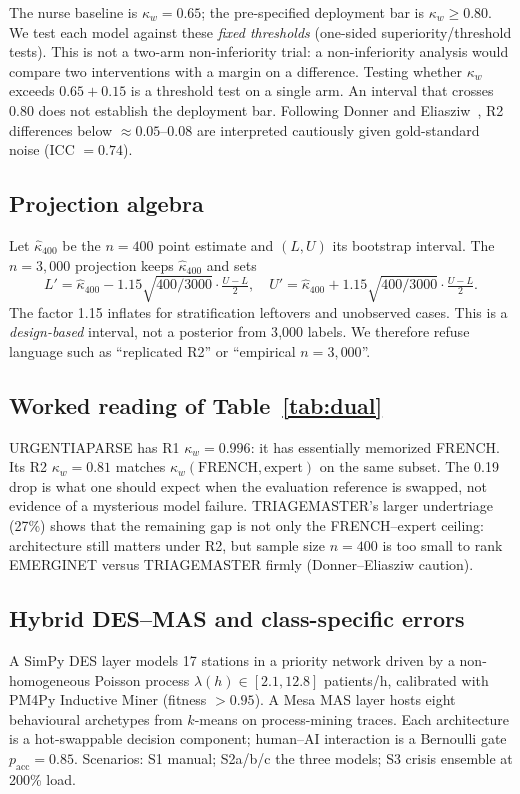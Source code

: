\documentclass[conference]{IEEEtran}
\begin{document}
The nurse baseline is $\kappa_w=0.65$; the pre-specified deployment bar is $\kappa_w\geq0.80$. We test each model against these \emph{fixed thresholds} (one-sided superiority/threshold tests). This is not a two-arm non-inferiority trial: a non-inferiority analysis would compare two interventions with a margin on a difference. Testing whether $\kappa_w$ exceeds $0.65+0.15$ is a threshold test on a single arm. An interval that crosses 0.80 does not establish the deployment bar. Following Donner and Eliasziw~\cite{donner1992}, R2 differences below $\approx0.05$--$0.08$ are interpreted cautiously given gold-standard noise (ICC $=0.74$).

\subsection{Projection algebra}
Let $\hat\kappa_{400}$ be the $n=400$ point estimate and $(L,U)$ its bootstrap interval. The $n=3{,}000$ projection keeps $\hat\kappa_{400}$ and sets
\begin{equation}
  L'=\hat\kappa_{400}-1.15\sqrt{400/3000}\cdot\tfrac{U-L}{2},\quad
  U'=\hat\kappa_{400}+1.15\sqrt{400/3000}\cdot\tfrac{U-L}{2}.
\end{equation}
The factor 1.15 inflates for stratification leftovers and unobserved cases. This is a \emph{design-based} interval, not a posterior from 3{,}000 labels. We therefore refuse language such as ``replicated R2'' or ``empirical $n=3{,}000$''.

\subsection{Worked reading of Table~\ref{tab:dual}}
URGENTIAPARSE has R1 $\kappa_w=0.996$: it has essentially memorized FRENCH. Its R2 $\kappa_w=0.81$ matches $\kappa_w(\mathrm{FRENCH},\mathrm{expert})$ on the same subset. The 0.19 drop is what one should expect when the evaluation reference is swapped, not evidence of a mysterious model failure. TRIAGEMASTER's larger undertriage (27\%) shows that the remaining gap is not only the FRENCH--expert ceiling: architecture still matters under R2, but sample size $n=400$ is too small to rank EMERGINET versus TRIAGEMASTER firmly (Donner--Eliasziw caution).

\subsection{Hybrid DES--MAS and class-specific errors}
A SimPy DES layer models 17 stations in a priority network driven by a non-homogeneous Poisson process $\lambda(h)\in[2.1,12.8]$ patients/h, calibrated with PM4Py Inductive Miner (fitness $>0.95$). A Mesa MAS layer hosts eight behavioural archetypes from $k$-means on process-mining traces. Each architecture is a hot-swappable decision component; human--AI interaction is a Bernoulli gate $p_{\mathrm{acc}}=0.85$. Scenarios: S1 manual; S2a/b/c the three models; S3 crisis ensemble at 200\% load.
\end{document}
